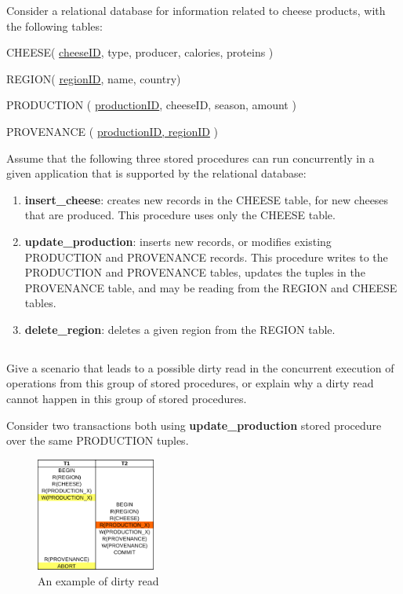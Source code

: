 {\color{gray}Consider a relational database for information related to cheese products, with the following tables:

\tab CHEESE( \underline{cheeseID}, type, producer, calories, proteins )

\tab REGION( \underline{regionID}, name, country)

\tab PRODUCTION ( \underline{productionID}, cheeseID, season, amount )

\tab PROVENANCE ( \underline{productionID, regionID} )

Assume that the following three stored procedures can run concurrently in a given application that is supported by the relational database:
\begin{enumerate}

	\item \textbf{insert\_cheese}: creates new records in the CHEESE table, for new cheeses that are produced. This procedure uses only the CHEESE table.

	\item \textbf{update\_production}: inserts new records, or modifies existing PRODUCTION and PROVENANCE records. This procedure writes to the PRODUCTION and PROVENANCE tables, updates the tuples in the PROVENANCE table, and may be reading from the REGION and CHEESE tables.

	\item \textbf{delete\_region}: deletes a given region from the REGION table.

\end{enumerate}
}

\subsection{}
{\color{gray}Give a scenario that leads to a possible dirty read in the concurrent execution of operations from this group of stored procedures, or explain why a dirty read cannot happen in this group of stored procedures.}

Consider two transactions both using \textbf{update\_production} stored procedure over the same PRODUCTION tuples.

\begin{figure}[H]
	\centering
	\includegraphics[width=0.35\textwidth]{dirty_read.png}
	\caption{An example of dirty read}
\end{figure}

